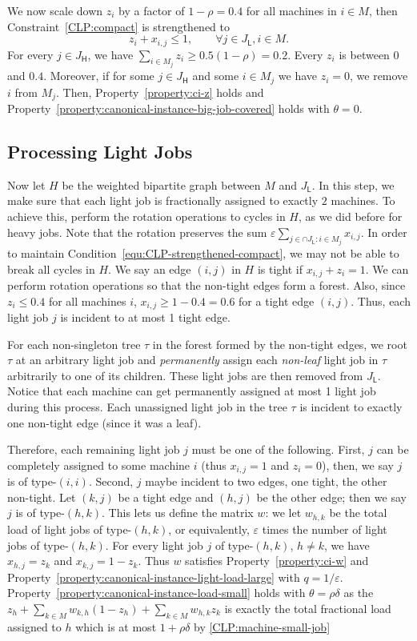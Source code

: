 \documentclass[11pt]{article}
\newcounter{prop}
\newcommand{\sfH}{{\mathsf H}}
\newcommand{\sfL}{{\mathsf L}}
\newcommand{\eps}{\varepsilon}
\renewcommand{\epsilon}{\varepsilon}
\renewcommand{\epsilon}{\varepsilon}
\begin{document}
We now scale down $z_i$ by a factor of $1 - \rho = 0.4$ for all machines in $i \in M$, then Constraint~\eqref{CLP:compact} is strengthened to
\begin{equation}
z_i + x_{i,j} \leq 1, \qquad \forall j\in J_\sfL, i\in M.
\label{equ:CLP-strengthened-compact}
\end{equation}
For every $j \in J_\sfH$, we have $\sum_{i \in M_j}z_i \geq 0.5(1-\rho) = 0.2$. Every $z_i$ is between $0$ and $0.4$. Moreover, if for some $j \in J_\sfH$ and some $i \in M_j$ we have $z_i = 0$, we remove $i$ from $M_j$. Then, Property~\ref{property:ci-z} holds and Property~\ref{property:canonical-instance-big-job-covered} holds with $\theta = 0$.

\subsection{Processing Light Jobs}
Now let $H$ be the weighted bipartite graph between $M$ and $J_\sfL$. In this step, we make sure that each light job is fractionally assigned to exactly $2$ machines.   To achieve this, perform the rotation operations to cycles in $H$, as we did before for heavy jobs. Note that the rotation preserves the sum $\epsilon \sum_{j \in \cap J_\sfL: i \in M_j} x_{i,j}$. In order to maintain Condition~\eqref{equ:CLP-strengthened-compact}, we may not be able to break all cycles in $H$.  We say an edge $(i, j)$ in $H$ is tight if $x_{i,j} + z_i = 1$.  We can perform rotation operations so that the non-tight edges form a forest.  Also, since $z_i \leq 0.4$ for all machines $i$, $x_{i,j} \geq 1-0.4= 0.6$ for a tight edge $(i,j)$.  Thus, each light job $j$ is incident to at most 1 tight edge.

For each non-singleton tree $\tau$ in the forest formed by the non-tight edges,  we root $\tau$ at an arbitrary light job and {\em permanently} assign each {\em non-leaf} light job in $\tau$ arbitrarily to one of its children. These light jobs are then removed from $J_\sfL$. 
Notice that each machine can get permanently assigned at most 1 light job during this process.  Each unassigned light job in the tree $\tau$ is incident to exactly one non-tight edge (since it was a leaf).

Therefore, each remaining light job $j$ must be one of the following. First, $j$ can be completely assigned to some machine $i$ (thus $x_{i, j} = 1$ and $z_i = 0$), then, we say $j$ is of type-$(i, i)$. Second, $j$ maybe incident to two edges, one tight, the other non-tight. Let $(k, j)$ be a tight edge and $(h, j)$ be the other edge; then we say $j$ is of type-$(h, k)$.   This lets us define the matrix $w$: we let $w_{h,k}$ be the total load of light jobs of type-$(h, k)$, or equivalently, $\eps$ times the number of light jobs of type-$(h, k)$.  For every light job $j$ of type-$(h,k)$, $h\neq k$, we have $x_{h,j} = z_k$ and $x_{k,j} = 1- z_k$.   Thus $w$ satisfies Property~\ref{property:ci-w} and Property~\ref{property:canonical-instance-light-load-large} with $q = 1/\eps$.  Property~\ref{property:canonical-instance-load-small} holds with $\theta = \rho\delta$ as the $z_h + \sum_{k\in M}w_{k, h}(1-z_h) + \sum_{k \in M}w_{h,k}z_k$ is exactly the total fractional load assigned to $h$ which is at most $1+\rho\delta$ by \eqref{CLP:machine-small-job}
\end{document}
